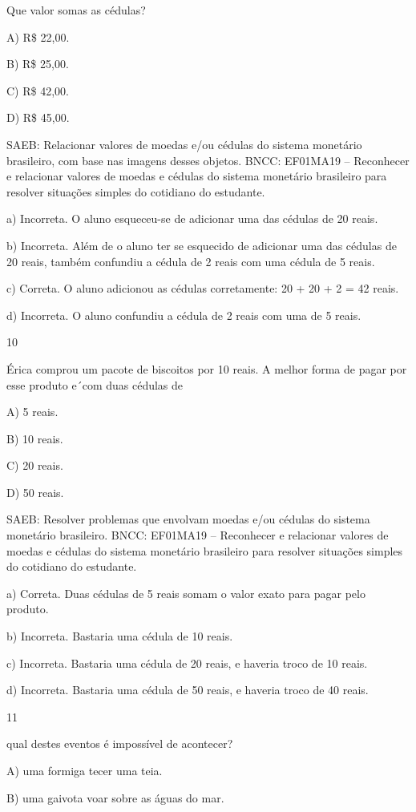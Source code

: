 Que valor somas as cédulas?

A) R\$ 22,00.

B) R\$ 25,00.

C) R\$ 42,00.

D) R\$ 45,00.

SAEB: Relacionar valores de moedas e/ou cédulas do sistema
monetário brasileiro, com base nas imagens desses objetos.
BNCC: EF01MA19 -- Reconhecer e relacionar valores de moedas e cédulas do
sistema monetário brasileiro para resolver situações simples do
cotidiano do estudante.

a) Incorreta. O aluno esqueceu-se de adicionar uma das cédulas de 20
reais.

b) Incorreta. Além de o aluno ter se esquecido de adicionar uma das
cédulas de 20 reais, também confundiu a cédula de 2 reais com
uma cédula de 5 reais.

c) Correta. O aluno adicionou as cédulas corretamente: 20 + 20 + 2 = 42
reais.

d) Incorreta. O aluno confundiu a cédula de 2 reais com uma de 5
reais.

\num{10}

Érica comprou um pacote de biscoitos por 10 reais. A melhor
forma de pagar por esse produto e´com duas cédulas de

A) 5 reais.

B) 10 reais.

C) 20 reais.

D) 50 reais.

SAEB: Resolver problemas que envolvam moedas e/ou cédulas do
sistema monetário brasileiro.
BNCC: EF01MA19 -- Reconhecer e relacionar valores de moedas e cédulas do
sistema monetário brasileiro para resolver situações simples do
cotidiano do estudante.

a) Correta. Duas cédulas de 5 reais somam o valor exato para pagar pelo produto.

b) Incorreta. Bastaria uma cédula de 10 reais.

c) Incorreta. Bastaria uma cédula de 20 reais, e haveria troco de 10 reais.

d) Incorreta. Bastaria uma cédula de 50 reais, e haveria troco de 40 reais.

\num{11}

qual destes eventos é impossível de acontecer?

A) uma formiga tecer uma teia.

B) uma gaivota voar sobre as águas do mar.

